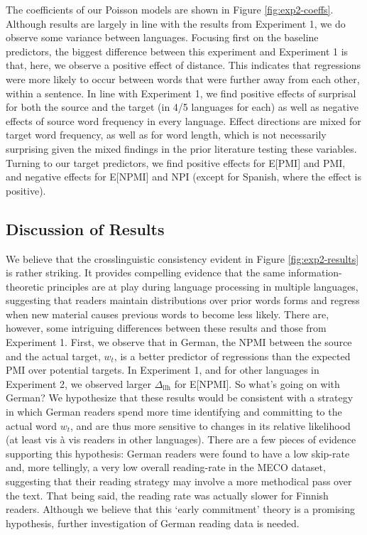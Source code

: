 \documentclass[12pt]{article}
\newcommand{\targetindex}{t}
\newcommand{\target}{$w_{\targetindex}$\xspace}
\newcommand{\dllmath}{\Delta_{\mathrm{llh}}}
\newcommand{\dll}{$\dllmath$\xspace}
\begin{document}
The coefficients of our Poisson models are shown in Figure \ref{fig:exp2-coeffs}. Although results are largely in line with the results from Experiment 1, we do observe some variance between languages. Focusing first on the baseline predictors, the biggest difference between this experiment and Experiment 1 is that, here, we observe a positive effect of distance. This indicates that regressions were more likely to occur between words that were further away from each other, within a sentence. In line with Experiment 1, we find positive effects of surprisal for both the source and the target (in 4/5 languages for each) as well as negative effects of source word frequency in every language. Effect directions are mixed for target word frequency, as well as for word length, which is not necessarily surprising given the mixed findings in the prior literature testing these variables. Turning to our target predictors, we find positive effects for E[PMI] and PMI, and negative effects for E[NPMI] and NPI (except for Spanish, where the effect is positive).

\subsection{Discussion of Results}

We believe that the crosslinguistic consistency evident in Figure \ref{fig:exp2-results} is rather striking. It provides compelling evidence that the same information-theoretic principles are at play during language processing in multiple languages, suggesting that readers maintain distributions over prior words forms and regress when new material causes previous words to become less likely. There are, however, some intriguing differences between these results and those from Experiment 1. First, we observe that in German, the NPMI between the source and the actual target, \target, is a better predictor of regressions than the expected PMI over potential targets. In Experiment 1, and for other languages in Experiment 2, we observed larger \dll for E[NPMI]. So what's going on with German? We hypothesize that these results would be consistent with a strategy in which German readers spend more time identifying and committing to the actual word \target, and are thus more sensitive to  changes in its relative likelihood (at least vis \`{a} vis readers in other languages). There are a few pieces of evidence supporting this hypothesis: German readers were found to have a low skip-rate and, more tellingly, a very low overall reading-rate in the MECO dataset, suggesting that their reading strategy may involve a more methodical pass over the text. That being said, the reading rate was actually slower for Finnish readers. Although we believe that this `early commitment' theory is a promising hypothesis, further investigation of German reading data is needed.
\end{document}
